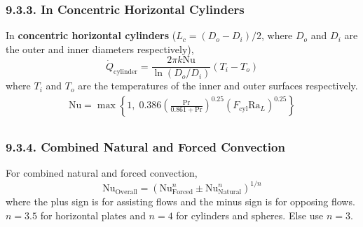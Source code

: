 \begin{multicols*}{2}
\subsubsection*{9.3.3. In Concentric Horizontal Cylinders}
In \textbf{concentric horizontal cylinders} ($L_c = (D_o - D_i)/2$, where $D_o$ and $D_i$ are the outer and inner diameters respectively),
\begin{equation*}
    \dot{Q}_{\text{cylinder}} = \frac{2\pi k \text{Nu}}{\ln(D_o/D_i)}(T_i - T_o) 
\end{equation*}
where $T_i$ and $T_o$ are the temperatures of the inner and outer surfaces respectively.
\begin{gather*}
    \text{Nu} = \max\left\{1, \;0.386 \left(\frac{\text{Pr}}{0.861 + \text{Pr}}\right)^{0.25}(F_{\text{cyl}} \text{Ra}_L)^{0.25}\right\}\\
\end{gather*}
\subsubsection*{9.3.4. Combined Natural and Forced Convection}
For combined natural and forced convection, 
\begin{equation*}
    \text{Nu}_{\text{Overall}} = \left(\text{Nu}_{\text{Forced}}^n \pm \text{Nu}_{\text{Natural}}^n\right)^{1/n}
\end{equation*}
where the plus sign is for assisting flows and the minus sign is for opposing flows. $n = 3.5$ for 
horizontal plates and $n = 4$ for cylinders and spheres. Else use $n = 3$.
\end{multicols*}

